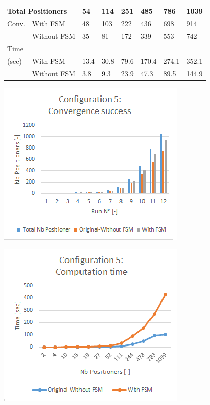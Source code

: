 \documentclass[]{spie}  %
\begin{document}
\begin{figure}[H]
\begin{minipage}{9cm}
{\begin{tabular}{|l|l|l|l|l|l|l|l|}
					\hline
					\multicolumn{2}{|l|}{Total Positioners}  & 54 & 114 & 251 & 485 & 786 & 1039\\
					\hline
					Conv. & With FSM  & 48 & 103  & 222 & 436 & 698 & 914 \\
					\cline{2-8}
					& Without FSM & 35  & 81 & 172 & 339 & 553 & 742 \\
					\hline
					Time\\(sec) & With FSM  & 13.4 & 30.8 & 79.6 & 170.4 & 274.1 & 352.1 \\
					\cline{2-8}
					& Without FSM  & 3.8  & 9.3 & 23.9 & 47.3 & 89.5  & 144.9 \\
					\hline
				\end{tabular}
				}
			\end{minipage}
		\end{figure}
\begin{figure}[H]
	\begin{minipage}{8.7cm}
		\begin{minipage}[t]{4.3cm}
			\includegraphics[scale=0.56]{images/configuration5_conv}
			\label{configuration1_conv}
		\end{minipage}
		\begin{minipage}[t]{1.0cm}
			\includegraphics[scale=0.57]{images/configuration5_time}

\end{minipage}
\end{minipage}
\end{figure}
\end{document}
